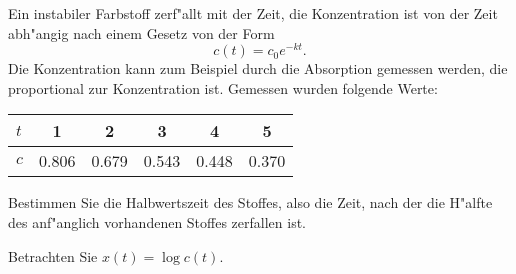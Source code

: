 Ein instabiler Farbstoff zerf"allt mit der Zeit, die Konzentration
ist von der Zeit abh"angig nach einem Gesetz von der Form
\[
c(t)=c_0e^{-kt}.
\]
Die Konzentration kann zum Beispiel durch die Absorption gemessen
werden, die proportional zur Konzentration ist. Gemessen wurden
folgende Werte:
\begin{center}
\begin{tabular}{|l|ccccc|}
\hline
$t$&1&2&3&4&5
\\
\hline
$c$&0.806&0.679&0.543&0.448&0.370
\\
\hline
\end{tabular}
\end{center}
Bestimmen Sie die Halbwertszeit des Stoffes, also die Zeit, nach
der die H"alfte des anf"anglich vorhandenen Stoffes zerfallen ist.

\begin{hinweis}
Betrachten Sie $x(t)=\log c(t)$.
\end{hinweis}

